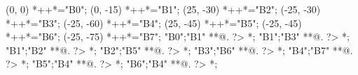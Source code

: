 \documentclass[landscape]{article}
\begin{document}

\clearpage


\clearpage


\clearpage


\clearpage


\clearpage


\clearpage


\clearpage


\clearpage


\clearpage

\begin{scriptsize}
\xy(0, 0)
	*++{}*\frm{-,}="B0";
(0, -15)
	*++{}*\frm{-,}="B1";
(25, -30)
	*++{}*\frm{-,}="B2";
(-25, -30)
	*++{}*\frm{-,}="B3";
(-25, -60)
	*++{}*\frm{-,}="B4";
(25, -45)
	*++{}*\frm{-,}="B5";
(-25, -45)
	*++{}*\frm{-,}="B6";
(-25, -75)
	*++{}*\frm{-,}="B7";
"B0";"B1" **@{.} ?> *{\dir{>}};
"B1";"B3" **@{.} ?> *{\dir{>}};
"B1";"B2" **@{.} ?> *{\dir{>}};
"B2";"B5" **@{.} ?> *{\dir{>}};
"B3";"B6" **@{.} ?> *{\dir{>}};
"B4";"B7" **@{.} ?> *{\dir{>}};
"B5";"B4" **@{.} ?> *{\dir{>}};
"B6";"B4" **@{.} ?> *{\dir{>}};
\endxy
\end{scriptsize}
\end{document}
